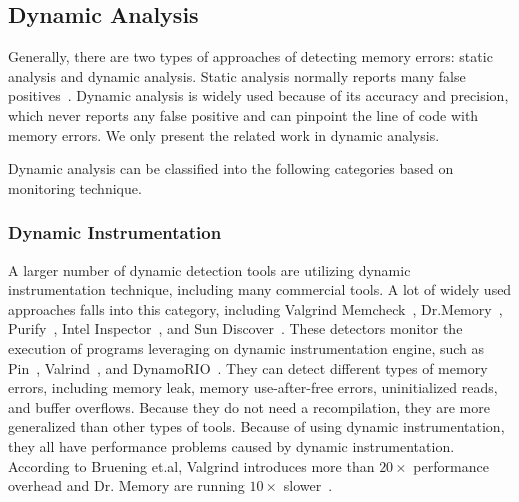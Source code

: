 

\subsection{Dynamic Analysis}
Generally, there are two types of approaches of detecting memory errors: static analysis and dynamic analysis. Static analysis normally reports many false positives~\cite{Wagner00afirst, CSSV}. Dynamic analysis is widely used because of its accuracy and precision, which never reports any false positive and can pinpoint the line of code with memory errors. We only present the related work in dynamic analysis. 

Dynamic analysis can be classified into the following categories based on monitoring technique. 

\subsubsection{Dynamic Instrumentation} 
A larger number of dynamic detection tools are utilizing dynamic instrumentation technique, including many commercial tools. A lot of widely used approaches falls into this category, including Valgrind Memcheck~\cite{overflow:valgrind}, Dr.Memory~\cite{overflow:drmemory}, Purify~\cite{overflow:purify}, Intel Inspector~\cite{overflow:inspector}, and Sun Discover~\cite{overflow:discover}.
These detectors monitor the execution of programs leveraging on dynamic instrumentation engine, such as Pin~\cite{Pin}, Valrind~\cite{overflow:valgrind}, and DynamoRIO~\cite{DynamoRIO}. 
They can detect different types of memory errors, including memory leak, memory use-after-free errors, uninitialized reads, and buffer overflows. Because they do not need a recompilation, they are more generalized than other types of tools. Because of using dynamic instrumentation, they all have performance problems caused by dynamic instrumentation. According to Bruening et.al, Valgrind introduces more than $20\times$ performance overhead and Dr. Memory are running $10\times$ slower~\cite{overflow:drmemory}. 


